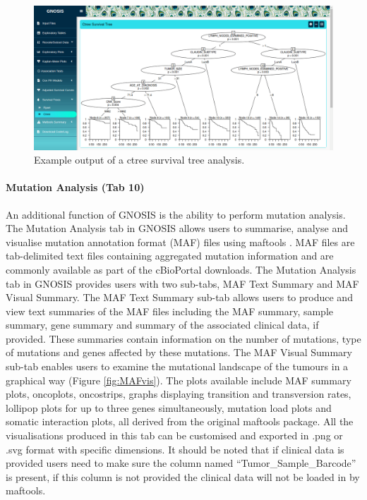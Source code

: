 \begin{figure}[H]
\center
\includegraphics[width=1\textwidth]{../figures/Chapter_3/GNOSIS_Fig9.png}
\caption[Example output of a ctree survival tree analysis.]{Example output of a ctree survival tree analysis.}
\label{fig:GNOSIS_Tab8}
\end{figure}

\paragraph{Mutation Analysis (Tab 10)}
\hfill

\noindent An additional function of GNOSIS is the ability to perform mutation analysis. The Mutation Analysis tab in GNOSIS allows users to summarise, analyse and visualise mutation annotation format (MAF) files using maftools \citep{maftools}. MAF files are tab-delimited text files containing aggregated mutation information and are commonly available as part of the cBioPortal downloads. The Mutation Analysis tab in GNOSIS provides users with two sub-tabs, MAF Text Summary and MAF Visual Summary. The MAF Text Summary sub-tab allows users to produce and view text summaries of the MAF files including the MAF summary, sample summary, gene summary and summary of the associated clinical data, if provided. These summaries contain information on the number of mutations, type of mutations and genes affected by these mutations. The MAF Visual Summary sub-tab enables users to examine the mutational landscape of the tumours in a graphical way (Figure \ref{fig:MAFvis}). The plots available include MAF summary plots, oncoplots, oncostrips, graphs displaying transition and transversion rates, lollipop plots for up to three genes simultaneously, mutation load plots and somatic interaction plots, all derived from the original maftools package. All the visualisations produced in this tab can be customised and exported in .png or .svg format with specific dimensions. It should be noted that if clinical data is provided users need to make sure the column named “Tumor\_Sample\_Barcode” is present, if this column is not provided the clinical data will not be loaded in by maftools.  

